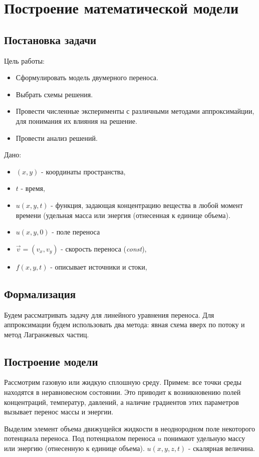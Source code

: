 \chapter{Построение математической модели}
\section{Постановка задачи}
Цель работы:
\begin{itemize}
	\item Сформулировать  модель двумерного переноса.
	\item Выбрать схемы решения.
	\item Провести численные эксперименты с различными методами аппроксимайции, для понимания их влияния на решение.
	\item Провести анализ решений.
\end{itemize}

Дано:
\begin{itemize}

	\item ${(x,y)}$ - координаты  пространства,
	\item $t$ - время,
		\item  $u(x, y,t)$ - функция, задающая концентрацию вещества в любой момент времени (удельная масса или
		энергия (отнесенная к единице объема). 
		\item  $u(x,y,0)$ - поле переноса
	\item $\vec{v} = (v_{x}, v_{y}) $ - скорость переноса (\textit{const}),
	\item $f(x,y,t)$ - описывает источники и стоки,
\end{itemize}
\section{Формализация}
Будем рассматривать задачу для линейного уравнения переноса.
Для аппроксимации будем использовать два метода: явная схема вверх по потоку и метод Лагранжевых частиц.

\newpage
\section{Построение модели}
Рассмотрим газовую или жидкую сплошную среду. Примем: все точки среды
находятся в неравновесном состоянии. Это приводит к возникновению полей
концентраций, температур, давлений, а наличие градиентов этих параметров вызывает
перенос массы и энергии.

Выделим элемент объема движущейся жидкости в неоднородном поле некоторого
потенциала переноса. Под потенциалом переноса
$u$ понимают удельную массу или
энергию (отнесенную к единице объема).
$u (x, y, z, t)$ - скалярная величина.

